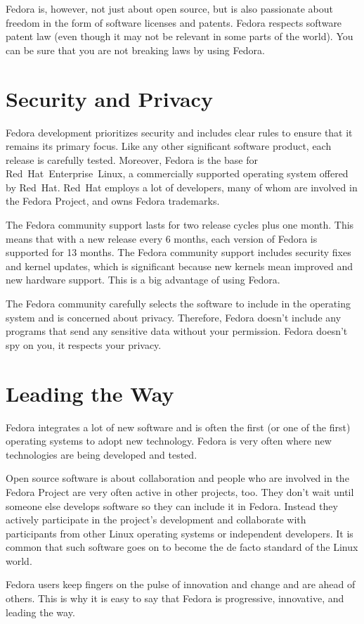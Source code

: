 Fedora is, however, not just about open source, but is also passionate about freedom in the form of software licenses and patents. Fedora respects software patent law (even though it may not be relevant in some parts of the world). You can be sure that you are not breaking laws by using Fedora.

\section*{Security and Privacy}

Fedora development prioritizes security and includes clear rules to ensure that it remains its primary focus. Like any other significant software product, each release is carefully tested. Moreover, Fedora is the base for Red~Hat~Enterprise~Linux, a commercially supported operating system offered by Red~Hat. Red~Hat employs a lot of developers, many of whom are involved in the Fedora Project, and owns Fedora trademarks.

The Fedora community support lasts for two release cycles plus one month. This means that with a new release every 6 months, each version of Fedora is supported for 13 months. The Fedora community support includes security fixes and kernel updates, which is significant because new kernels mean improved and new hardware support. This is a big advantage of using Fedora.

The Fedora community carefully selects the software to include in the operating system and is concerned about privacy. Therefore, Fedora doesn't include any programs that send any sensitive data without your permission. Fedora doesn't spy on you, it respects your privacy.

\section*{Leading the Way}

Fedora integrates a lot of new software and is often the first (or one of the first) operating systems to adopt new technology. Fedora is very often where new technologies are being developed and tested.

Open source software is about collaboration and people who are involved in the Fedora Project are very often active in other projects, too. They don't wait until someone else develops software so they can include it in Fedora. Instead they actively participate in the project's development and collaborate with participants from other Linux operating systems or independent developers. It is common that such software goes on to become the de facto standard of the Linux world.

Fedora users keep fingers on the pulse of innovation and change and are ahead of others. This is why it is easy to say that Fedora is progressive, innovative, and leading the way.
